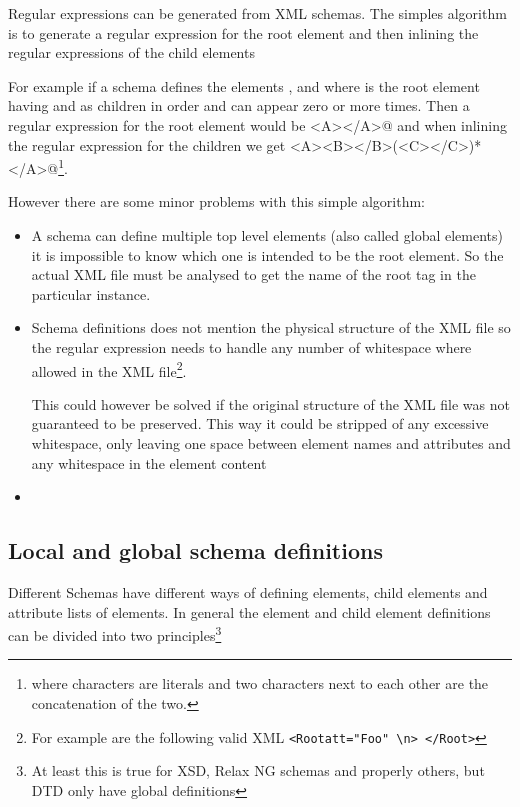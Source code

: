 \documentclass[a4paper, oneside]{memoir}
\theoremstyle{definition}
\begin{document}
Regular expressions can be generated from XML schemas. The simples algorithm is
to generate a regular expression for the root element and then inlining the
regular expressions of the child elements

For example if a schema defines the elements \verb@A@, \verb@B@ and \verb@C@
where \verb@A@ is the root element having \verb@B@ and \verb@C@ as children in
order and \verb@C@ can appear zero or more times. Then a regular expression for
the root element would be \verb@<A></A>@ and when inlining the regular
expression for the children we get
\verb@<A><B></B>(<C></C>)*</A>@\footnote{where characters are literals and two
  characters next to each other are the concatenation of the two.}.
  
  However there are some minor problems with this simple algorithm:

  \begin{itemize}
  \item A schema can define multiple top level elements (also called global
    elements) it is impossible to know which one is intended to be the root
    element. So the actual XML file must be analysed to get the name of the root
    tag in the particular instance.

  \item Schema definitions does not mention the physical structure of the XML
    file so the regular expression needs to handle any number of whitespace
    where allowed in the XML file\footnote{For example are the following valid
      XML \texttt{<Root{\textvisiblespace}att="Foo"\textvisiblespace%
        \textvisiblespace\textbackslash{n}\textvisiblespace>\textvisiblespace%
        </Root\textvisiblespace\textvisiblespace>}}.

    This could however be solved if the original structure of the XML file was
    not guaranteed to be preserved. This way it could be stripped of any
    excessive whitespace, only leaving one space between element names and
    attributes and any whitespace in the element content

  \item 

  \end{itemize}

\subsection{Local and global schema definitions}
\label{sec:local-global-schema-definitions}
Different Schemas have different ways of defining elements, child elements and
attribute lists of elements. In general the element and child element
definitions can be divided into two principles\footnote{At least this is true for
  XSD, Relax NG schemas and properly others, but DTD only have global definitions}
\end{document}
